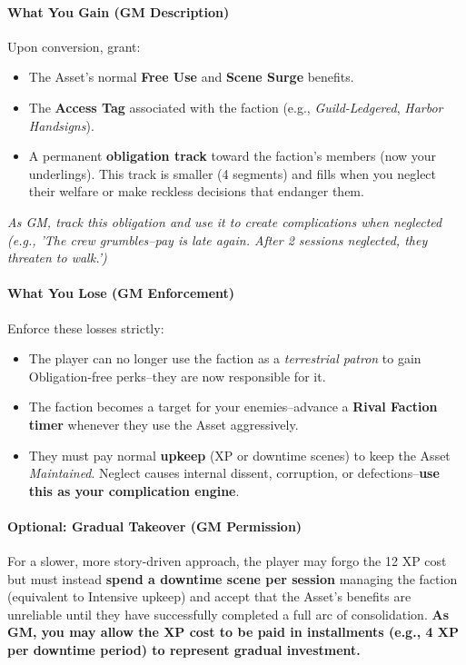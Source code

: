 \begin{tcolorbox}[colback=black!3!white,colframe=black!60!white,title=From Faction to Asset/Follower: Taking Over a Terrestrial Patron (GM Guidance),label=sec:takeover-sidebar,breakable]
\begin{enumerate}
\paragraph{What You Gain (GM Description)}
Upon conversion, grant:  
\begin{itemize}
  \item The Asset's normal \textbf{Free Use} and \textbf{Scene Surge} benefits.  
  \item The \textbf{Access Tag} associated with the faction (e.g., \textit{Guild-Ledgered}, \textit{Harbor Handsigns}).  
  \item A permanent \textbf{obligation track} toward the faction's members (now your underlings). This track is smaller (4 segments) and fills when you neglect their welfare or make reckless decisions that endanger them.  
\end{itemize}
\textit{As GM, track this obligation and use it to create complications when neglected (e.g., 'The crew grumbles--pay is late again. After 2 sessions neglected, they threaten to walk.')}

\paragraph{What You Lose (GM Enforcement)}
Enforce these losses strictly:  
\begin{itemize}
  \item The player can no longer use the faction as a \emph{terrestrial patron} to gain Obligation-free perks--they are now responsible for it.  
  \item The faction becomes a target for your enemies--advance a \textbf{Rival Faction timer} whenever they use the Asset aggressively.  
  \item They must pay normal \textbf{upkeep} (XP or downtime scenes) to keep the Asset \emph{Maintained}. Neglect causes internal dissent, corruption, or defections--\textbf{use this as your complication engine}.  
\end{itemize}

\paragraph{Optional: Gradual Takeover (GM Permission)}
For a slower, more story-driven approach, the player may forgo the 12 XP cost but must instead \textbf{spend a downtime scene per session} managing the faction (equivalent to Intensive upkeep) and accept that the Asset's benefits are unreliable until they have successfully completed a full arc of consolidation. \textbf{As GM, you may allow the XP cost to be paid in installments (e.g., 4 XP per downtime period) to represent gradual investment.}  


\end{enumerate}
\end{tcolorbox}
